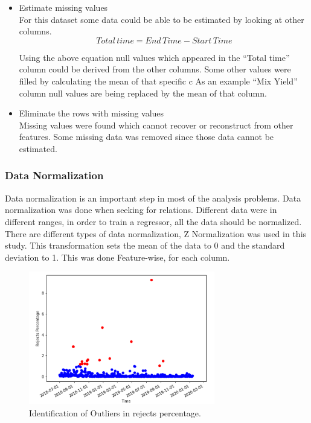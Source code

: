 \begin{itemize}
  \item Estimate missing values \\
  For this dataset some data could be able to be estimated by looking at other columns. 
  \begin{equation}\label{total_time}
    Total\,time = End\,Time - Start\,Time
\end{equation}

Using the above equation null values which appeared in the “Total time” column could be derived from the other columns. 
Some other values were filled by calculating the mean of that specific c
As an example “Mix Yield” column null values are being replaced by the mean of that column.\\


  \item Eliminate the rows with missing values \\
Missing values were found which cannot recover or reconstruct from other features. Some missing data was removed since those data cannot be estimated. \\

\end{itemize}


\subsubsection {Data Normalization}
Data normalization is an important step in most of the analysis problems. Data normalization was done when seeking for relations. Different data were in different ranges, in order to train a regressor, all the data should be normalized. There are different types of data normalization, Z Normalization was used in this study. This transformation sets the mean of the data to 0 and the standard deviation to 1. This was done Feature-wise, for each column. \\

\begin{figure}[ht]
  \begin{center}
  \includegraphics[width=3.2in]{photo/outliers.png}
  \caption{Identification of Outliers in rejects percentage.}\label{outliers}
  \end{center}
\end{figure}

